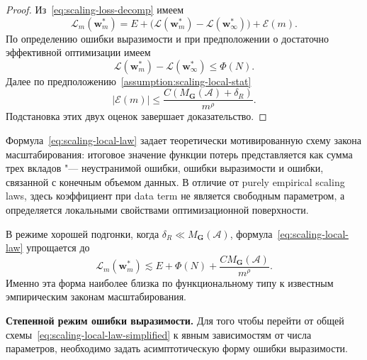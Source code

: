 \begin{proof}
    Из~\eqref{eq:scaling-loss-decomp} имеем
    \begin{equation}
        \mathcal L_m(\mathbf w_m^*)
        =
        E
        +
        \big(\mathcal L(\mathbf w_m^*)-\mathcal L(\mathbf w_{\infty}^*)\big)
        +
        \mathcal E(m).
    \end{equation}
    По определению ошибки выразимости и при предположении о достаточно эффективной оптимизации имеем
    \begin{equation}
        \mathcal L(\mathbf w_m^*)-\mathcal L(\mathbf w_{\infty}^*)
        \le
        \Phi(N).
    \end{equation}
    Далее по предположению~\ref{assumption:scaling-local-stat}
    \begin{equation}
        |\mathcal E(m)|
        \le
        \frac{C\left(M_{\mathbf G}(\mathcal A)+\delta_R\right)}{m^{\rho}}.
    \end{equation}
    Подстановка этих двух оценок завершает доказательство.
\end{proof}

Формула~\eqref{eq:scaling-local-law} задает теоретически мотивированную схему закона масштабирования: итоговое значение функции потерь представляется как сумма трех вкладов "--- неустранимой ошибки, ошибки выразимости и ошибки, связанной с конечным объемом данных. В отличие от purely empirical scaling laws, здесь коэффициент при data term не является свободным параметром, а определяется локальными свойствами оптимизационной поверхности.

\begin{remark}
    В режиме хорошей подгонки, когда $\delta_R \ll M_{\mathbf G}(\mathcal A)$, формула~\eqref{eq:scaling-local-law} упрощается до
    \begin{equation}
        \label{eq:scaling-local-law-simplified}
        \mathcal L_m(\mathbf w_m^*)
        \lesssim
        E
        +
        \Phi(N)
        +
        \frac{C M_{\mathbf G}(\mathcal A)}{m^{\rho}}.
    \end{equation}
    Именно эта форма наиболее близка по функциональному типу к известным эмпирическим законам масштабирования.
\end{remark}

\textbf{Степенной режим ошибки выразимости.} Для того чтобы перейти от общей схемы~\eqref{eq:scaling-local-law-simplified} к явным зависимостям от числа параметров, необходимо задать асимптотическую форму ошибки выразимости.

